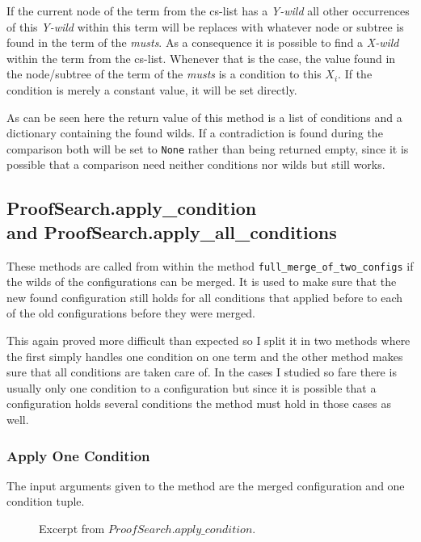 If the current node of the term from the cs-list has a \emph{Y-wild} all other occurrences of this \emph{Y-wild} within this term will be replaces with whatever node or subtree is found in the term of the \emph{musts}. As a consequence it is possible to find a \emph{X-wild} within the term from the cs-list. Whenever that is the case, the value found in the node/subtree of the term of the \emph{musts} is a condition to this $X_i$. If the condition is merely a constant value, it will be set directly.

As can be seen here the return value of this method is a list of conditions and a dictionary containing the found wilds. If a contradiction is found during the comparison both will be set to \texttt{None} rather than being returned empty, since it is possible that a comparison need neither conditions nor wilds but still works.

\subsection[ProofSearch.apply\_conditions]{ProofSearch.apply\_condition \\and ProofSearch.apply\_all\_conditions}
These methods are called from within the method \texttt{full\_merge\_of\_two\_configs} if the wilds of the configurations can be merged. It is used to make sure that the new found configuration still holds for all conditions that applied before to each of the old configurations before they were merged.

This again proved more difficult than expected so I split it in two methods where the first simply handles one condition on one term and the other method makes sure that all conditions are taken care of. In the cases I studied so fare there is usually only one condition to a configuration but since it is possible that a configuration holds several conditions the method must hold in those cases as well.

\subsubsection{Apply One Condition}
The input arguments given to the method are the merged configuration and one condition tuple.

\begin{figure}[H]
	\vspace{-10pt}
	
	\vspace{-10pt}
	\caption{Excerpt from $ProofSearch.apply\_condition$.}
	\vspace{-10pt}
\end{figure}

